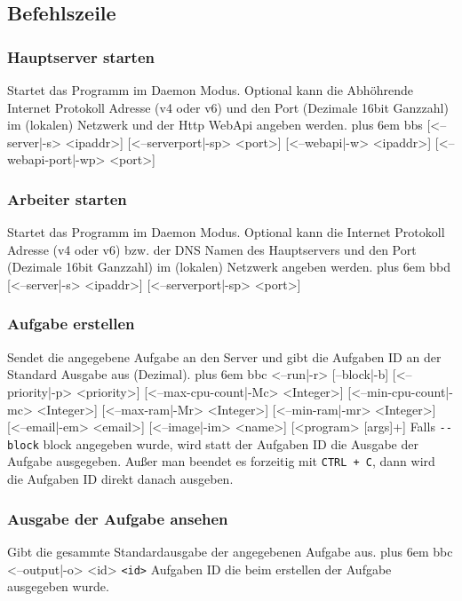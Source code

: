 \documentclass[a4paper,12pt]{article}
\makeatletter
\newenvironment{mycode}
 {\def\@xobeysp{\ }\verbatim\rightskip=0pt plus 6em\relax}
 {\endverbatim}
\makeatother
\begin{document}
\subsection{Befehlszeile}

\subsubsection{Hauptserver starten}
Startet das Programm im \gls{Daemon} Modus. Optional kann die Abhöhrende Internet Protokoll Adresse (v4 oder v6) und den Port (Dezimale 16bit Ganzzahl) im (lokalen) Netzwerk und der Http WebApi angeben werden.
\begin{mycode}
bbs [<--server|-s> <ipaddr>] [<--serverport|-sp> <port>] [<--webapi|-w> <ipaddr>] [<--webapi-port|-wp> <port>]
\end{mycode}

\subsubsection{Arbeiter starten}
Startet das Programm im \gls{Daemon} Modus. Optional kann die Internet Protokoll Adresse (v4 oder v6) bzw. der DNS Namen des Hauptservers und den Port (Dezimale 16bit Ganzzahl) im (lokalen) Netzwerk angeben werden.
\begin{mycode}
bbd [<--server|-s> <ipaddr>] [<--serverport|-sp> <port>]
\end{mycode}

\subsubsection{Aufgabe erstellen}
Sendet die angegebene Aufgabe an den Server und gibt die Aufgaben ID an der Standard Ausgabe aus (Dezimal).
\begin{mycode}
bbc <--run|-r> [--block|-b] [<--priority|-p> <priority>] [<--max-cpu-count|-Mc> <Integer>] [<--min-cpu-count|-mc> <Integer>] [<--max-ram|-Mr> <Integer>] [<--min-ram|-mr> <Integer>] [<--email|-em> <email>] [<--image|-im> <name>] [<program> [args]+]
\end{mycode}
Falls \texttt{-{}-block} block angegeben wurde, wird statt der Aufgaben ID die Ausgabe der Aufgabe ausgegeben.
Außer man beendet es forzeitig mit \texttt{CTRL + C}, dann wird die Aufgaben ID direkt danach ausgeben.

\subsubsection{Ausgabe der Aufgabe ansehen}
Gibt die gesammte Standardausgabe der angegebenen Aufgabe aus.
\begin{mycode}
bbc <--output|-o> <id>
\end{mycode}
\texttt{<id>} Aufgaben ID die beim erstellen der Aufgabe ausgegeben wurde.
\end{document}
